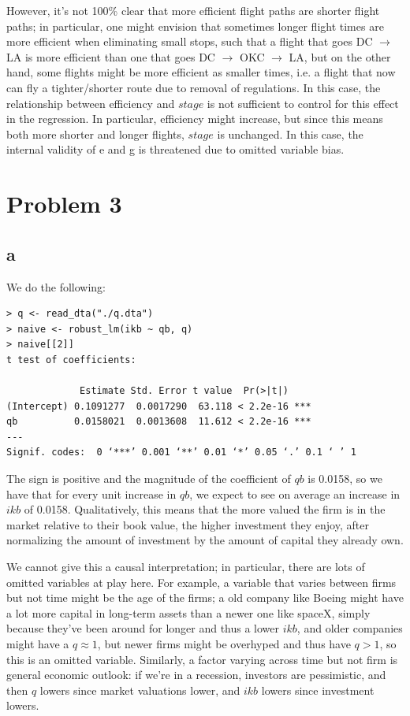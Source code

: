 \documentclass[12pt,letterpaper]{article}
\theoremstyle{definition}
\begin{document}
However, it's not 100\% clear that more efficient flight paths are shorter flight paths; in particular, one might envision that sometimes longer flight times are more efficient when eliminating small stops, such that a flight that goes DC $\rightarrow$ LA is more efficient than one that goes DC $\rightarrow$ OKC $\rightarrow$ LA, but on the other hand, some flights might be more efficient as smaller times, i.e. a flight that now can fly a tighter/shorter route due to removal of regulations. In this case, the relationship between efficiency and $stage$ is not sufficient to control for this effect in the regression. In particular, efficiency might increase, but since this means both more shorter and longer flights, $stage$ is unchanged. In this case, the internal validity of e and g is threatened due to omitted variable bias.

\section*{Problem 3}

\subsection*{a}

We do the following:
\begin{Verbatim}[fontsize=\small]
> q <- read_dta("./q.dta")
> naive <- robust_lm(ikb ~ qb, q)
> naive[[2]]
t test of coefficients:

             Estimate Std. Error t value  Pr(>|t|)
(Intercept) 0.1091277  0.0017290  63.118 < 2.2e-16 ***
qb          0.0158021  0.0013608  11.612 < 2.2e-16 ***
---
Signif. codes:  0 ‘***’ 0.001 ‘**’ 0.01 ‘*’ 0.05 ‘.’ 0.1 ‘ ’ 1
\end{Verbatim}

The sign is positive and the magnitude of the coefficient of $qb$ is 0.0158, so we have that for every unit increase in $qb$, we expect to see on average an increase in $ikb$ of 0.0158. Qualitatively, this means that the more valued the firm is in the market relative to their book value, the higher investment they enjoy, after normalizing the amount of investment by the amount of capital they already own.

We cannot give this a causal interpretation; in particular, there are lots of omitted variables at play here. For example, a variable that varies between firms but not time might be the age of the firms; a old company like Boeing might have a lot more capital in long-term assets than a newer one like spaceX, simply because they've been around for longer and thus a lower $ikb$, and older companies might have a $q \approx 1$, but newer firms might be overhyped and thus have $q > 1$, so this is an omitted variable. Similarly, a factor varying across time but not firm is general economic outlook: if we're in a recession, investors are pessimistic, and then $q$ lowers since market valuations lower, and $ikb$ lowers since investment lowers.
\end{document}
